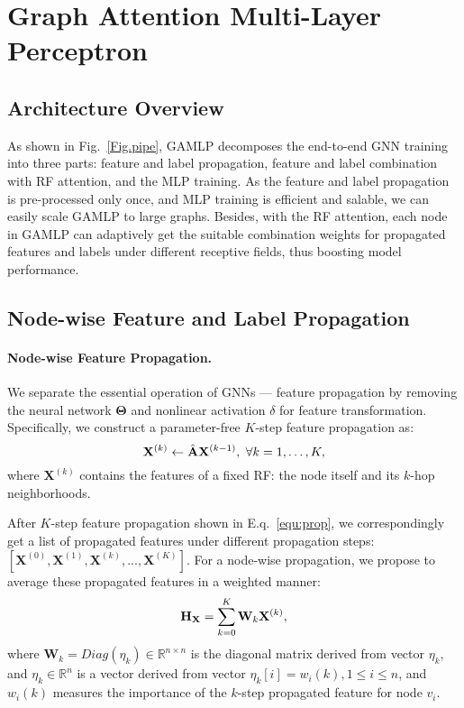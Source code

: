 \documentclass[sigconf]{acmart}
\begin{document}
\section{Graph Attention Multi-Layer Perceptron}
\label{sec4}
\subsection{Architecture Overview}
As shown in Fig.~\ref{Fig.pipe}, GAMLP decomposes the end-to-end GNN training into three parts: feature and label propagation, feature and label combination with RF attention, and the MLP training. 
As the feature and label propagation is pre-processed only once, and MLP training is efficient and salable, we can easily scale GAMLP to large graphs. Besides, with the RF attention, each node in GAMLP can adaptively get the suitable combination weights for propagated features and labels under different receptive fields, thus boosting model performance.

\subsection{Node-wise Feature and Label Propagation}  
\label{NFP}
\noindent\paragraph{\textbf{Node-wise Feature Propagation.}} We separate the essential operation of GNNs — feature propagation by removing the neural network $\mathbf{\Theta}$ and nonlinear activation $\delta$ for feature transformation. 
Specifically, we construct a parameter-free $K$-step feature propagation as:
\begin{equation}
\small
    \mathbf{X}^{(k)} \gets \hat{\mathbf{A}}\mathbf{X}^{(k-1)},\ \forall  k=1,\ldots, K,
    \label{equ:prop}
\end{equation}
where $\mathbf{X}^{(k)}$ contains the features of a fixed RF: the node itself and its $k$-hop neighborhoods. 

After $K$-step feature propagation shown in E.q.~\ref{equ:prop}, we correspondingly get a list of propagated features under different propagation steps: $[\mathbf{X}^{(0)}, \mathbf{X}^{(1)}, \mathbf{X}^{(k)}, ..., \mathbf{X}^{(K)}]$.
For a node-wise propagation, we propose to average these propagated features in a weighted manner:
\begin{equation}
\small
      \mathbf{H}_{\mathbf{X}}=\sum_{k=0}^K \mathbf{W}_k \mathbf{X}^{(k)} ,
      \label{combine}
\end{equation}
where $\mathbf{W}_k  = Diag(\eta_{k}) \in \mathbb{R}^{n \times n}$ is the diagonal matrix derived from vector $\eta_{k}$, and $\eta_{k} \in \mathbb{R}^{n}$ is a vector derived from vector $\eta_{k}[i] = w_{i}(k), 1\le i\le n$, and $w_{i}(k)$ measures the importance of the $k$-step propagated feature for node $v_i$.
\end{document}
